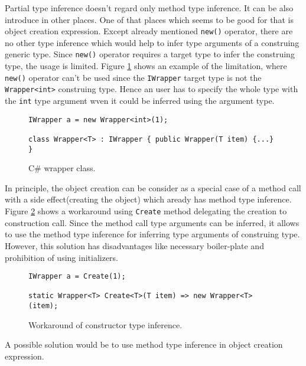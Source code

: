 \par
{}
Partial type inference doesn't regard only method type inference.
It can be also introduce in other places.
One of that places which seems to be good for that is object creation expression.
Except already mentioned \texttt{new()} operator, there are no other type inference which would help to infer type arguments of a construing generic type.
Since \texttt{new()} operator requires a target type to infer the construing type, the usage is limited.
Figure \ref{img34:wrapper} shows an example of the limitation, where \texttt{new()} operator can't be used since the \texttt{IWrapper} target type is not the \texttt{Wrapper<int>} construing type.
Hence an user has to specify the whole type with the \texttt{int} type argument wven it could be inferred using the argument type.
\begin{figure}[h]
\begin{lstlisting}[style=csharp]
IWrapper a = new Wrapper<int>(1);

class Wrapper<T> : IWrapper { public Wrapper(T item) {...} }
\end{lstlisting}
\caption{C\# wrapper class.}
\label{img34:wrapper}
\end{figure}
\par
{}
In principle, the object creation can be consider as a special case of a method call with a side effect(creating the object) which aready has method type inference.
Figure \ref{img35:workaroung} shows a workaround using \texttt{Create} method delegating the creation to construction call.
Since the method call type arguments can be inferred, it allows to use the method type inference for inferring type arguments of construing type.
However, this solution has disadvantages like necessary boiler-plate and prohibition of using initializers.
\begin{figure}[h]
\begin{lstlisting}[style=csharp]
IWrapper a = Create(1);

static Wrapper<T> Create<T>(T item) => new Wrapper<T>(item);
\end{lstlisting}
\caption{Workaround of constructor type inference.}
\label{img35:workaroung}
\end{figure}
\par
{}
A possible solution would be to use method type inference in object creation expression.

